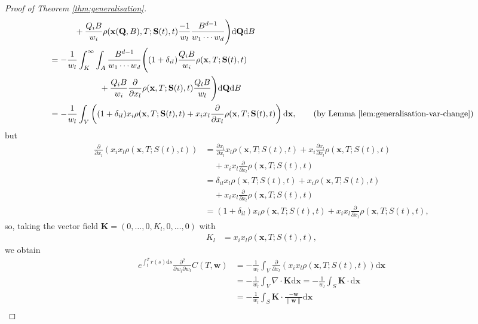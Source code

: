 \documentclass[english]{article}
\numberwithin{equation}{section}
\numberwithin{figure}{section}
\theoremstyle{bolddescit}
\theoremstyle{definition}
\theoremstyle{definition}
\theoremstyle{plain}
\theoremstyle{plain}
\theoremstyle{bolddesc}
\theoremstyle{plain}
\theoremstyle{remark}
\begin{document}
\begin{proof}[Proof of Theorem \ref{thm:generalisation}]
\begin{align*}
      &\ \ \ \ \ \ \ \ \ + \frac{Q_i B}{w_i} \rho(\mathbf{x}(\mathbf{Q},B),T;\mathbf{S}(t),t) \frac{-1}{w_l} \frac{B^{d-1}}{w_1 \cdots w_d}
    \Bigg) \mathrm{d}\mathbf{Q} \mathrm{d}B\\
    &= -\frac{1}{w_l} \int_K^\infty \int_A \frac{B^{d-1}}{w_1 \cdots w_d} \Bigg(
      (1 + \delta_{il}) \frac{Q_i B}{w_i} \rho(\mathbf{x},T;\mathbf{S}(t),t)\\
      &\ \ \ \ \ \ \ \ \ \ \ \ \ \ \ \ \ \ + \frac{Q_i B}{w_i} \frac{\partial}{\partial x_l} \rho(\mathbf{x},T;\mathbf{S}(t),t) \frac{Q_l B}{w_l} \Bigg) \mathrm{d}\mathbf{Q} \mathrm{d}B\\
    &= -\frac{1}{w_l} \int_V \left( (1 + \delta_{il}) x_i \rho(\mathbf{x},T;\mathbf{S}(t),t)
      + x_i x_l \frac{\partial}{\partial x_l} \rho(\mathbf{x},T;\mathbf{S}(t),t) \right) \mathrm{d}\mathbf{x}, \tag{by Lemma \ref{lem:generalisation-var-change}}
  \end{align*}
  but
  \begin{align*}
    \frac{\partial}{\partial x_l} \left(x_i x_l \rho(\mathbf{x},T;S(t),t)\right)
    &= \frac{\partial x_i}{\partial x_l} x_l \rho(\mathbf{x},T;S(t),t)
    + x_i \frac{\partial x_l}{\partial x_l} \rho(\mathbf{x},T;S(t),t)\\
    &\ \ \ \ \ + x_i x_l \frac{\partial}{\partial x_l} \rho(\mathbf{x},T;S(t),t)\\
    &= \delta_{il} x_l \rho(\mathbf{x},T;S(t),t) + x_i \rho(\mathbf{x},T;S(t),t)\\
    &\ \ \ \ \ + x_i x_l \frac{\partial}{\partial x_l} \rho(\mathbf{x},T;S(t),t)\\
    &= (1 + \delta_{il}) x_i \rho(\mathbf{x},T;S(t),t) + x_i x_l \frac{\partial}{\partial x_l} \rho(\mathbf{x},T;S(t),t),
  \end{align*}
  so, taking the vector field $\mathbf{K} = (0,\ldots,0,K_l,0,\ldots,0)$ with
  \begin{align*}
    K_l &= x_i x_l \rho(\mathbf{x},T;S(t),t),
  \end{align*}
  we obtain
  \begin{align*}
    e^{\int_t^T r(s) \mathrm{d}s} \frac{\partial^2}{\partial w_i \partial w_l} C(T,\mathbf{w})
    &= -\frac{1}{w_l} \int_V \frac{\partial}{\partial x_l} \left(x_i x_l \rho(\mathbf{x},T;S(t),t)\right) \mathrm{d}\mathbf{x}\\
    &= -\frac{1}{w_l} \int_V \nabla \cdot \mathbf{K} \mathrm{d}\mathbf{x}
    = -\frac{1}{w_l} \int_S \mathbf{K} \cdot \mathrm{d}\mathbf{x}\\
    &= -\frac{1}{w_l} \int_S \mathbf{K} \cdot \frac{-\mathbf{w}}{\|\mathbf{w}\|} \mathrm{d}\mathbf{x}\\

\end{align*}
\end{proof}
\end{document}

